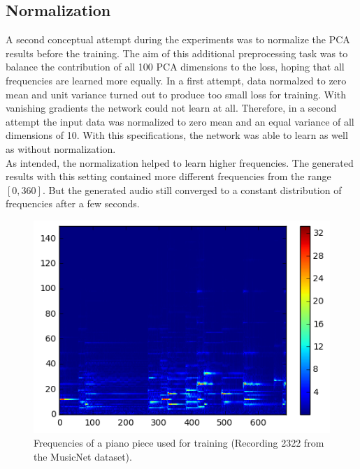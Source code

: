 \documentclass[10pt,conference,compsocconf]{IEEEtran}
\begin{document}
\subsection{Normalization}
A second conceptual attempt during the experiments was to normalize the PCA results before the training. The aim of this additional preprocessing task was to balance the contribution of all 100 PCA dimensions to the loss, hoping that all frequencies are learned more equally. In a first attempt, data normalzed to zero mean and unit variance turned out to produce too small loss for training. With vanishing gradients the network could not learn at all. Therefore, in a second attempt the input data was normalized to zero mean and an equal variance of all dimensions of 10. With this specifications, the network was able to learn as well as without normalization.\\
As intended, the normalization helped to learn higher frequencies. The generated results with this setting contained more different frequencies from the range $[0,360]$. But the generated audio still converged to a constant distribution of frequencies after a few seconds. 
\begin{figure}[tbp]
  \centering
  \includegraphics[width=\columnwidth]{figures/original_frequencies.png}
  \caption{Frequencies of a piano piece used for training (Recording 2322 from the MusicNet dataset). }
  \label{fig:original_frequencies}
\end{figure}
\end{document}
